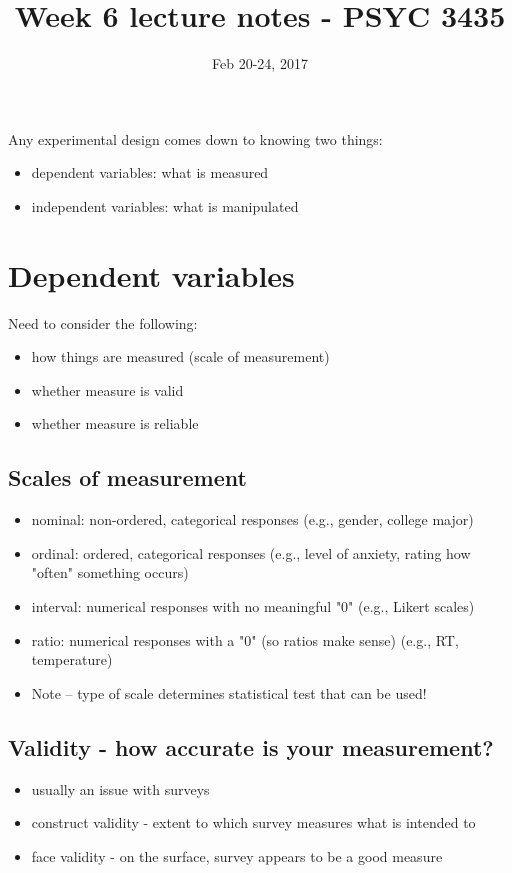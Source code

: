 \documentclass[11pt]{article}
\date{Feb 20-24, 2017}
\title{Week 6 lecture notes - PSYC 3435}
\begin{document}
\maketitle
Any experimental design comes down to knowing two things:
\begin{itemize}
\item dependent variables: what is measured
\item independent variables: what is manipulated
\end{itemize}

\section*{Dependent variables}
\label{sec-1}

Need to consider the following:
\begin{itemize}
\item how things are measured (scale of measurement)
\item whether measure is valid
\item whether measure is reliable
\end{itemize}

\subsection*{Scales of measurement}
\label{sec-1-1}
\begin{itemize}
\item nominal: non-ordered, categorical responses (e.g., gender, college major)
\item ordinal: ordered, categorical responses (e.g., level of anxiety, rating how "often" something occurs)
\item interval: numerical responses with no meaningful "0" (e.g., Likert scales)
\item ratio: numerical responses with a "0" (so ratios make sense) (e.g., RT, temperature)
\item Note -- type of scale determines statistical test that can be used!
\end{itemize}

\subsection*{Validity - how accurate is your measurement?}
\label{sec-1-2}
\begin{itemize}
\item usually an issue with surveys
\item construct validity - extent to which survey measures what is intended to
\item face validity - on the surface, survey appears to be a good measure
\end{itemize}
\end{document}
